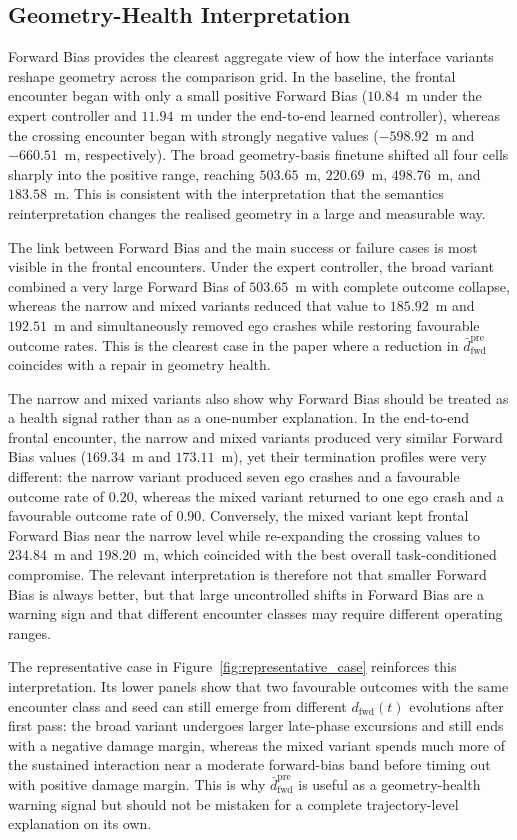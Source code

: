 \documentclass[drones,article,submit,pdftex,moreauthors]{Definitions/mdpi}
\begin{document}
\subsection{Geometry-Health Interpretation}

Forward Bias provides the clearest aggregate view of how the interface variants reshape geometry across the comparison grid. In the baseline, the frontal encounter began with only a small positive Forward Bias ($10.84$~m under the expert controller and $11.94$~m under the end-to-end learned controller), whereas the crossing encounter began with strongly negative values ($-598.92$~m and $-660.51$~m, respectively). The broad geometry-basis finetune shifted all four cells sharply into the positive range, reaching $503.65$~m, $220.69$~m, $498.76$~m, and $183.58$~m. This is consistent with the interpretation that the semantics reinterpretation changes the realised geometry in a large and measurable way.

The link between Forward Bias and the main success or failure cases is most visible in the frontal encounters. Under the expert controller, the broad variant combined a very large Forward Bias of $503.65$~m with complete outcome collapse, whereas the narrow and mixed variants reduced that value to $185.92$~m and $192.51$~m and simultaneously removed ego crashes while restoring favourable outcome rates. This is the clearest case in the paper where a reduction in $\bar{d}_{\mathrm{fwd}}^{\mathrm{pre}}$ coincides with a repair in geometry health.

The narrow and mixed variants also show why Forward Bias should be treated as a health signal rather than as a one-number explanation. In the end-to-end frontal encounter, the narrow and mixed variants produced very similar Forward Bias values ($169.34$~m and $173.11$~m), yet their termination profiles were very different: the narrow variant produced seven ego crashes and a favourable outcome rate of $0.20$, whereas the mixed variant returned to one ego crash and a favourable outcome rate of $0.90$. Conversely, the mixed variant kept frontal Forward Bias near the narrow level while re-expanding the crossing values to $234.84$~m and $198.20$~m, which coincided with the best overall task-conditioned compromise. The relevant interpretation is therefore not that smaller Forward Bias is always better, but that large uncontrolled shifts in Forward Bias are a warning sign and that different encounter classes may require different operating ranges.

The representative case in Figure~\ref{fig:representative_case} reinforces this interpretation. Its lower panels show that two favourable outcomes with the same encounter class and seed can still emerge from different $d_{\mathrm{fwd}}(t)$ evolutions after first pass: the broad variant undergoes larger late-phase excursions and still ends with a negative damage margin, whereas the mixed variant spends much more of the sustained interaction near a moderate forward-bias band before timing out with positive damage margin. This is why $\bar{d}_{\mathrm{fwd}}^{\mathrm{pre}}$ is useful as a geometry-health warning signal but should not be mistaken for a complete trajectory-level explanation on its own.
\end{document}
